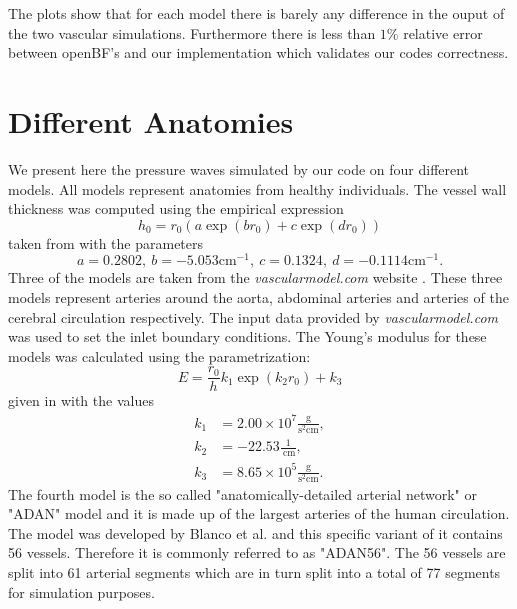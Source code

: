 \documentclass[a4paper, oneside]{discothesis}
\begin{document}
The plots show that for each model there is barely any difference in the ouput of the two vascular simulations.
Furthermore there is less than $1\%$ relative error between openBF's and our implementation which validates our codes correctness.

\section{Different Anatomies} \label{sec:da}
We present here the pressure waves simulated by our code on four different models.
All models represent anatomies from healthy individuals.
The vessel wall thickness was computed using the empirical expression
\begin{equation}
	h_0 = r_0 \left(a \exp(b r_0) + c \exp(d r_0)\right)
\end{equation}
taken from \cite{blanco2014anatomically} with the parameters
\begin{equation}
	a = 0.2802, \ b = -5.053 \text{cm}^{-1}, \ c = 0.1324,\  d = -0.1114 \text{cm}^{-1}.
\end{equation}
Three of the models are taken from the \emph{vascularmodel.com} website \cite{vascularmodel}.
These three models represent arteries around the aorta, abdominal arteries and arteries of the cerebral circulation respectively.
The input data provided by \emph{vascularmodel.com} was used to set the inlet boundary conditions.
The Young's modulus for these models was calculated using the parametrization:
\begin{equation}
	E = \frac{r_0}{h} k_1 \exp(k_2 r_0) + k_3
\end{equation}
given in \cite{ottesen2004applied} with the values
\begin{align}
	k_1 &= 2.00 \times 10^7 \frac{\text{g}}{\text{s}^2\text{cm}}, \\
	k_2 &= -22.53 \frac{1}{\ \text{cm}}, \\
	k_3 &= 8.65 \times 10^5 \frac{\text{g}}{\text{s}^2\text{cm}}.
\end{align}
The fourth model is the so called "anatomically-detailed arterial network" or "ADAN" model and it is made up of the largest arteries of the human circulation.
The model was developed by Blanco et al. \cite{blanco2014anatomically,blanco2014blood} and this specific variant of it contains 56 vessels.
Therefore it is commonly referred to as "ADAN56".
The 56 vessels are split into 61 arterial segments which are in turn split into a total of 77 segments for simulation purposes.
\end{document}

